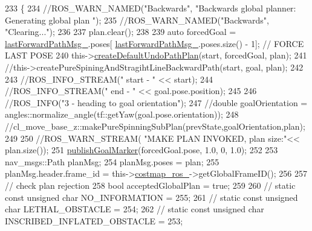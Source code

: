 \begin{DoxyCode}
233         \{
234             \textcolor{comment}{//ROS\_WARN\_NAMED("Backwards", "Backwards global planner: Generating global plan ");}
235             \textcolor{comment}{//ROS\_WARN\_NAMED("Backwards", "Clearing...");}
236 
237             plan.clear();
238 
239             \textcolor{keyword}{auto} forcedGoal = \hyperlink{classcl__move__base__z_1_1undo__path__global__planner_1_1UndoPathGlobalPlanner_a9a4a6e40f5b6cb5f77dedbc5b6170871}{lastForwardPathMsg\_}.poses[
      \hyperlink{classcl__move__base__z_1_1undo__path__global__planner_1_1UndoPathGlobalPlanner_a9a4a6e40f5b6cb5f77dedbc5b6170871}{lastForwardPathMsg\_}.poses.size() - 1]; \textcolor{comment}{// FORCE LAST POSE}
240             this->\hyperlink{classcl__move__base__z_1_1undo__path__global__planner_1_1UndoPathGlobalPlanner_a659c16f439d33ac7026a54bb65c26ca8}{createDefaultUndoPathPlan}(start, forcedGoal, plan);
241             \textcolor{comment}{//this->createPureSpiningAndStragihtLineBackwardPath(start, goal, plan);}
242 
243             \textcolor{comment}{//ROS\_INFO\_STREAM(" start - " << start);}
244             \textcolor{comment}{//ROS\_INFO\_STREAM(" end - " << goal.pose.position);}
245 
246             \textcolor{comment}{//ROS\_INFO("3 - heading to goal orientation");}
247             \textcolor{comment}{//double goalOrientation = angles::normalize\_angle(tf::getYaw(goal.pose.orientation));}
248             \textcolor{comment}{//cl\_move\_base\_z::makePureSpinningSubPlan(prevState,goalOrientation,plan);}
249 
250             \textcolor{comment}{//ROS\_WARN\_STREAM( "MAKE PLAN INVOKED, plan size:"<< plan.size());}
251             \hyperlink{classcl__move__base__z_1_1undo__path__global__planner_1_1UndoPathGlobalPlanner_a37a85e1cd57173902d8302cb8cb9b933}{publishGoalMarker}(forcedGoal.pose, 1.0, 0, 1.0);
252 
253             nav\_msgs::Path planMsg;
254             planMsg.poses = plan;
255             planMsg.header.frame\_id = this->\hyperlink{classcl__move__base__z_1_1undo__path__global__planner_1_1UndoPathGlobalPlanner_ab63eeb465e3ae989a6edcc4d059cf8f0}{costmap\_ros\_}->getGlobalFrameID();
256 
257             \textcolor{comment}{// check plan rejection}
258             \textcolor{keywordtype}{bool} acceptedGlobalPlan = \textcolor{keyword}{true};
259 
260             \textcolor{comment}{// static const unsigned char NO\_INFORMATION = 255;}
261             \textcolor{comment}{// static const unsigned char LETHAL\_OBSTACLE = 254;}
262             \textcolor{comment}{// static const unsigned char INSCRIBED\_INFLATED\_OBSTACLE = 253;}

\end{DoxyCode}
